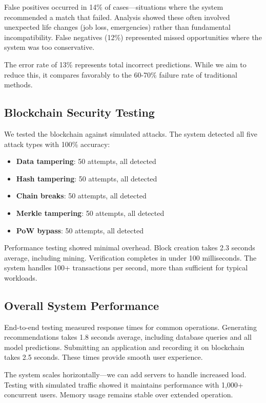 \documentclass[conference]{IEEEtran}
\begin{document}
False positives occurred in 14\% of cases—situations where the system recommended a match that failed. Analysis showed these often involved unexpected life changes (job loss, emergencies) rather than fundamental incompatibility. False negatives (12\%) represented missed opportunities where the system was too conservative.

The error rate of 13\% represents total incorrect predictions. While we aim to reduce this, it compares favorably to the 60-70\% failure rate of traditional methods.

\subsection{Blockchain Security Testing}

We tested the blockchain against simulated attacks. The system detected all five attack types with 100\% accuracy:

\begin{itemize}
\item \textbf{Data tampering}: 50 attempts, all detected
\item \textbf{Hash tampering}: 50 attempts, all detected
\item \textbf{Chain breaks}: 50 attempts, all detected
\item \textbf{Merkle tampering}: 50 attempts, all detected
\item \textbf{PoW bypass}: 50 attempts, all detected
\end{itemize}

Performance testing showed minimal overhead. Block creation takes 2.3 seconds average, including mining. Verification completes in under 100 milliseconds. The system handles 100+ transactions per second, more than sufficient for typical workloads.

\subsection{Overall System Performance}

End-to-end testing measured response times for common operations. Generating recommendations takes 1.8 seconds average, including database queries and all model predictions. Submitting an application and recording it on blockchain takes 2.5 seconds. These times provide smooth user experience.

The system scales horizontally—we can add servers to handle increased load. Testing with simulated traffic showed it maintains performance with 1,000+ concurrent users. Memory usage remains stable over extended operation.
\end{document}

